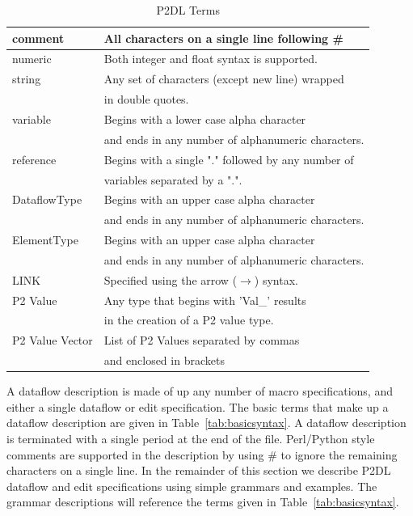 \documentclass[12pt]{article}
\begin{document}
\begin{table}[htdp]
\label{tab:basicsyntax}
\caption{P2DL Terms}
\begin{center}
\begin{tabular}{|l|l|}
\hline
comment & All characters on a single line following \# \\
\hline
numeric & Both integer and float syntax is supported.\\
\hline
string & Any set of characters (except new line) wrapped \\
          & in double quotes. \\
\hline
variable & Begins with a lower case alpha character \\ 
              & and ends in any number of alphanumeric characters.\\
\hline
reference & Begins with a single "." followed by any number of \\
                & variables separated by a ".". \\
\hline
DataflowType & Begins with an upper case alpha character \\
                       & and ends in any number of alphanumeric characters. \\
\hline
ElementType & Begins with an upper case alpha character \\
                       & and ends in any number of alphanumeric characters. \\
\hline
LINK & Specified using the arrow ($\rightarrow$) syntax. \\
\hline
P2 Value & Any type that begins with 'Val\_' results \\
                  & in the creation of a P2 value type. \\
\hline
P2 Value Vector & List of P2 Values separated by commas \\
                           & and enclosed in brackets \\
\hline
\end{tabular}
\end{center}
\label{default}
\end{table}%

A dataflow description is made of up any number of macro specifications, and either 
a single dataflow or edit specification. The basic terms that make up
a dataflow description are given in Table~\ref{tab:basicsyntax}. 
A dataflow description is terminated with a single period at
the end of the file. Perl/Python style comments are supported in the description by using \#
to ignore the remaining characters on a single line. In the remainder of this section we describe
P2DL dataflow and edit specifications using simple grammars and examples. The grammar 
descriptions will reference the terms given in Table~\ref{tab:basicsyntax}.
\end{document}

